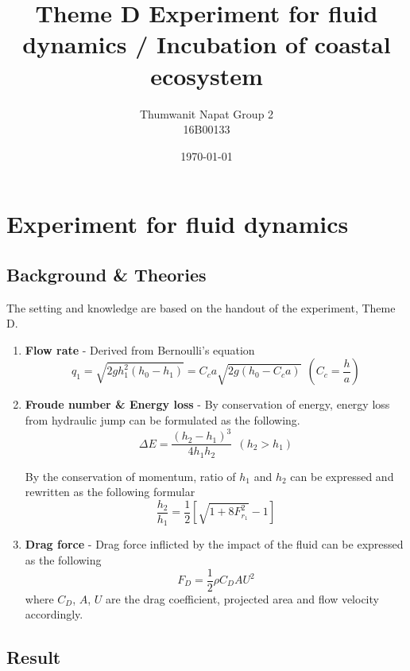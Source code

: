 \documentclass[a4paper]{report}
\title{Theme D Experiment for fluid dynamics / Incubation of coastal ecosystem}
\author{Thumwanit Napat Group 2 \\ 16B00133}
\date{\today}
\begin{document}
\maketitle

\chapter{Experiment for fluid dynamics}
\label{sec:firstExperiment}

\section{Background \& Theories}
The setting and knowledge are based on the handout of the experiment, Theme D.
\begin{enumerate}
    \item {\bf Flow rate} - Derived from Bernoulli's equation
    \begin{equation}\label{eq:flow_rate}
        q_1=\sqrt{2gh_1^2(h_0-h_1)}=C_ca\sqrt{2g(h_0-C_ca)} \ \ \left(C_c=\frac{h}{a}\right)    
    \end{equation}
    
    
    \item {\bf Froude number \& Energy loss} - 
    By conservation of energy, energy loss from hydraulic jump can be formulated as the following.
    \begin{equation}\label{eq:enegy}
        \Delta E = \frac{(h_2-h_1)^3}{4h_1h_2} \ \ (h_2 > h_1)
    \end{equation}

    By the conservation of momentum, ratio of $h_1$ and $h_2$ can be expressed and rewritten as the following formular
    \begin{equation}\label{eq:froude}
        \frac{h_2}{h_1}=\frac{1}{2}\left[\sqrt{1+8F_{r_1}^2}-1\right]
    \end{equation}
    
    \item {\bf Drag force} - Drag force inflicted by the impact of the fluid can be expressed as the following
    \begin{equation}\label{eq:drag}
        F_D=\frac{1}{2}\rho C_DAU^2
    \end{equation}
    where $C_D$, $A$, $U$ are the drag coefficient, projected area and flow velocity accordingly.
    
\end{enumerate}

\section{Result}
\end{document}
